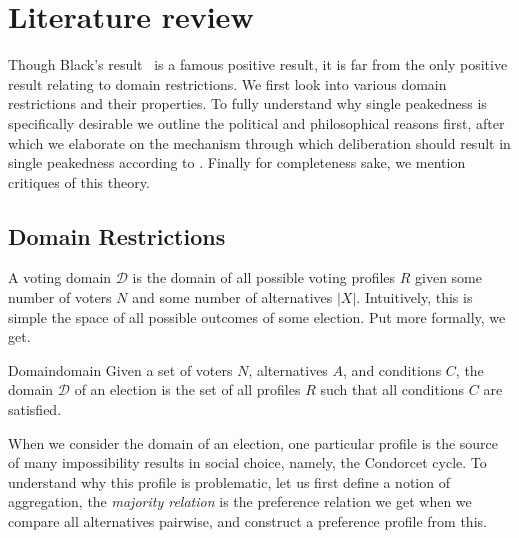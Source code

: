 \newpage
\chapter{Literature review}
\label{Literature}


Though Black's result~\citep{Black_1948} is a famous positive result, it is far from the only positive result relating to domain restrictions. We first look into various domain restrictions and their properties. To fully understand why single peakedness is specifically desirable we outline the political and philosophical reasons first, after which we elaborate on the mechanism through which deliberation should result in single peakedness according to \citet{List_2002}. Finally for completeness sake, we mention critiques of this theory.

\section{Domain Restrictions}
A voting domain $\mathcal{D}$ is the domain of all possible voting profiles \(R\) given some number of voters $N$ and some number of alternatives $|X|$. Intuitively, this is simple the space of all possible outcomes of some election. Put more formally, we get.

\begin{definition}{Domain}{domain}
	{
		Given a set of voters $N$, alternatives $A$, and conditions $C$, the domain $\mathcal{D}$ of an election is the set of all profiles $R$ such that all conditions $C$ are satisfied.
	}
\end{definition}

When we consider the domain of an election, one particular profile is the source of many impossibility results in social choice, namely, the Condorcet cycle. To understand why this profile is problematic, let us first define a notion of aggregation, the \textit{majority relation} is the preference relation we get when we compare all alternatives pairwise, and construct a preference profile from this. 

